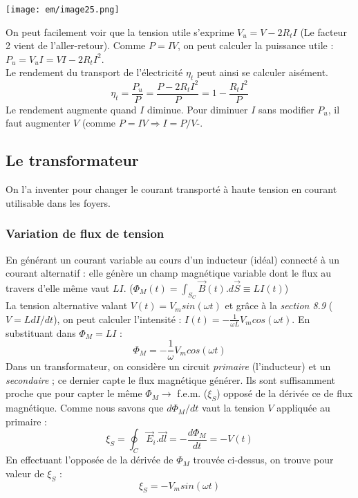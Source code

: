 \documentclass[british,french,11pt, a4paper, openany]{book}
\begin{document}
\begin{center}
	\texttt{[image: em/image25.png]}\\
\end{center}
On peut facilement voir que la tension utile s'exprime $V_u = V - 2 R_tI$ (Le facteur 2 vient de l'aller-retour). Comme $P = IV$, on peut calculer la puissance utile : $P_u = V_uI = VI - 2R_tI^2$.\\
Le rendement du transport de l'électricité $\eta_t$ peut ainsi se calculer aisément.
\begin{equation}
	\eta_t = \frac{P_u}{P} = \frac{P - 2R_tI^2}{P} = 1 - \frac{R_tI^2}{P}
\end{equation}
Le rendement augmente quand $I$ diminue. Pour diminuer $I$ sans modifier $P_u$, il faut augmenter $V$ (comme $P = IV \Rightarrow I = P/V$-.

\subsection{Le transformateur}
On l'a inventer pour changer le courant transporté à haute tension en courant utilisable dans les foyers.

\subsubsection{Variation de flux de tension}
En générant un courant variable au cours d'un inducteur (idéal) connecté à un courant alternatif : elle génère un champ magnétique variable dont le flux au travers d'elle même vaut $LI$. ($\Phi_M(t) = \int_{S_C} \vec{B}(t).d\vec{S} \equiv LI(t)$)\\

La tension alternative valant $V(t) = V_m sin(\omega t)$ et grâce à la \textit{section 8.9} ($V = LdI / dt$), on peut calculer l'intensité : $I(t) = -\frac{1}{\omega L}V_m cos(\omega t)$. En substituant dans $\Phi_M = LI$ :
\begin{equation}
	\Phi_M = -\frac{1}{\omega}V_m cos(\omega t)
\end{equation}
Dans un transformateur, on considère un circuit \textit{primaire} (l'inducteur) et un \textit{secondaire} ; ce dernier capte le flux magnétique générer. Ils sont suffisamment proche que pour capter le même $\Phi_M \rightarrow$ f.e.m. ($\xi_S$) opposé de la dérivée ce de flux magnétique. Comme nous savons que $d\Phi_M/dt$ vaut la tension $V$ appliquée au primaire : 
\begin{equation}
	\xi_S = \oint_C \vec{E}_i.\vec{dl} = - \frac{d\Phi_M}{dt} = - V(t)
\end{equation}
En effectuant l'opposée de la dérivée de $\Phi_M$ trouvée ci-dessus, on trouve pour valeur de $\xi_S$ :
\begin{equation}
	\xi_S = - V_m sin(\omega t)
\end{equation}
\end{document}
